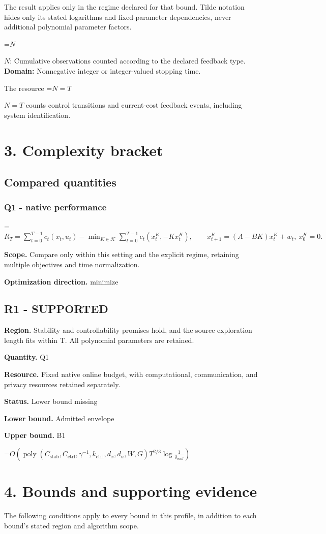 \documentclass[10pt,a4paper]{article}
\newcommand{\AtlasMath}[1]{\par\begingroup\centering\setbox0=\hbox{$\displaystyle #1$}\ifdim\wd0>1.4\linewidth\typeout{ATLAS WIDE FORMULA: \the\wd0}\fi\ifdim\wd0>\linewidth\resizebox{\linewidth}{!}{\box0}\else\box0\fi\par\endgroup}
\newcommand{\AtlasInlineMath}[1]{\begingroup\setbox0=\hbox{$#1$}\ifdim\wd0>.4\linewidth\endgroup\AtlasMath{#1}\else\endgroup$#1$\fi}
\begin{document}
The result applies only in the regime declared for that bound. Tilde notation hides only its stated logarithms and fixed-parameter dependencies, never additional polynomial parameter factors.

\AtlasInlineMath{N}: Cumulative observations counted according to the declared feedback type. \textbf{Domain:} Nonnegative integer or integer-valued stopping time.

The resource \AtlasInlineMath{N=T} counts control transitions and current-cost feedback events, including system identification.

\section{3. Complexity bracket}
\subsection{Compared quantities}
\subsubsection{Q1 - native performance}
\AtlasMath{R_T=\sum_{t=0}^{T-1}c_t(x_t,u_t)-\min_{K\in\mathcal K}\sum_{t=0}^{T-1}c_t(x_t^K,-Kx_t^K),\qquad x_{t+1}^K=(A-BK)x_t^K+w_t,\ x_0^K=0.}
\textbf{Scope.} Compare only within this setting and the explicit regime, retaining multiple objectives and time normalization.

\textbf{Optimization direction.} minimize

\subsection{R1 - SUPPORTED}
\textbf{Region.} Stability and controllability promises hold, and the source exploration length fits within T. All polynomial parameters are retained.

\textbf{Quantity.} Q1

\textbf{Resource.} Fixed native online budget, with computational, communication, and privacy resources retained separately.

\textbf{Status.} Lower bound missing

\textbf{Lower bound.} Admitted envelope

\textbf{Upper bound.} B1

\AtlasMath{O\!\left(\operatorname{poly}\!\left(C_{\mathrm{stab}},C_{\mathrm{ctrl}},\gamma^{-1},k_{\mathrm{ctrl}},d_x,d_u,W,G\right)T^{2/3}\log\!\frac1{\delta_{\mathrm{conf}}}\right)}
\section{4. Bounds and supporting evidence}
The following conditions apply to every bound in this profile, in addition to each bound's stated region and algorithm scope.
\end{document}
